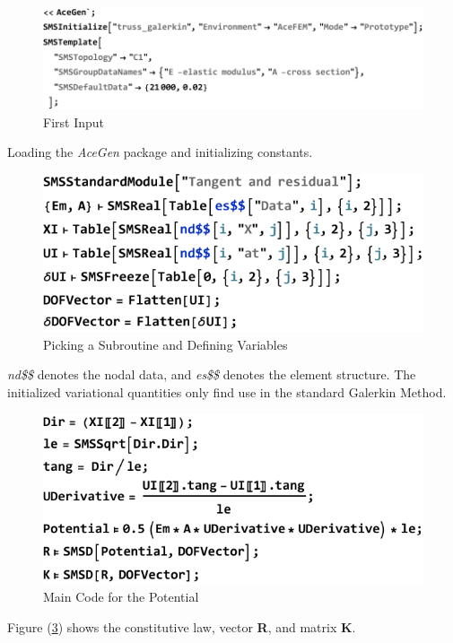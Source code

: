 \begin{figure}[htb]
	\includegraphics{figures/acegen_input_1}
	\caption{First Input}
	\label{fig:first_input}
\end{figure}

Loading the \textit{AceGen} package and initializing constants.


\begin{figure}[htb]
	\includegraphics{figures/acegen_input_2}
	\caption{Picking a Subroutine and Defining Variables}
	\label{fig:subroutine}
\end{figure}

\textit{nd\$\$} denotes the nodal data, and \textit{es\$\$} denotes the element structure.
The initialized variational quantities only find use in the standard Galerkin Method.  

\begin{figure}[htb]
	\includegraphics{figures/potentialcode}
	\caption{Main Code for the Potential}
	\label{fig:potential}
\end{figure}
Figure (\ref{fig:potential}) shows the constitutive law, vector \textbf{R}, and matrix \textbf{K}.

